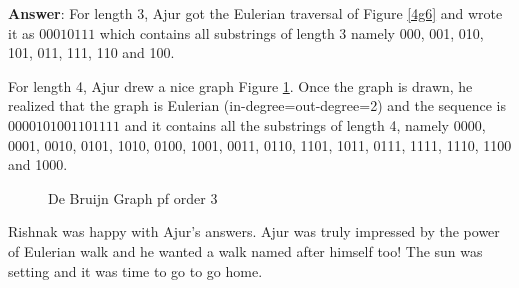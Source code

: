 \textbf{Answer}: For length 3, Ajur got the Eulerian traversal of Figure \ref{4g6} and wrote it as
$00010111$ which contains all substrings of length 3 namely 000, 001, 010, 101, 011, 111, 110 and 100.

For length 4, Ajur drew a nice graph Figure \ref{4a1}. Once the graph is drawn, he realized that the graph is Eulerian (in-degree=out-degree=2) and the sequence is $0000101001101111$ and it contains all the substrings of length 4, namely 0000, 0001, 0010, 0101, 1010, 0100, 1001, 0011,  0110, 1101, 1011, 0111, 1111, 1110, 1100 and 1000. 

\begin{figure}
\begin{center}
\caption{ De Bruijn Graph pf order 3}\label{4a1}
\end{center}
\end{figure}

Rishnak was happy with Ajur's answers. 
Ajur was truly impressed by the power of Eulerian walk and he wanted a walk named after himself too! The sun was setting and it was time to go to go home.